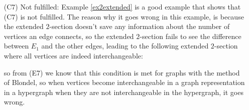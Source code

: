 \documentclass[a4paper,11pt]{report}
\begin{document}
\begin{itemize}
\begin{proof}
 \end{proof}
 Because the $2$-section preserves interchangeable vertices and we use the method of Blondel for which we already proved
 in (E6) that this condition holds, the result follows.
 \textit{(equal to`normal' 2-section)}   
 \item[(C7)] Not fulfilled:  Example \ref{ex2extended} is a good example 
 that shows that (C7) is not fulfilled. The reason why it goes wrong in this 
 example, is because the extended $2$-section doesn't save any information 
 about the number of vertices an edge connects, so the extended $2$-section fails to 
 see the difference between $E_1$ and the other edges, leading to the following extended $2$-section where all 
 vertices are indeed interchangeable:
      \begin{center}
\end{center}
  
 so from (E7) we know  that this condition is met for graphs with the method of
 Blondel, so when vertices become interchangeable in a graph representation in a 
 hypergraph when they are not interchangeable in the hypergraph, it goes wrong.
 

\end{itemize}
\end{document}
